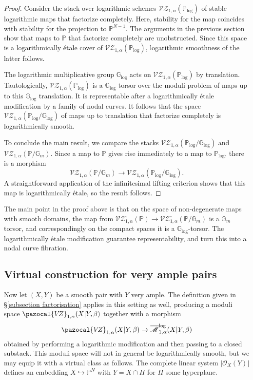 \documentclass[11pt]{amsart}
\newcommand{\PP}{\mathbb P}
\newcommand{\VZ}{\pazocal{V\!Z}}
\newcommand{\OO}{\mathcal{O}}
\renewcommand{\to}{\rightarrow}
\newcommand{\Mcal}{\mathcal{M}}
\newcommand{\ol}[1]{\overline{#1}}
\theoremstyle{definition}
\theoremstyle{definition}
\begin{document}
\begin{proof}
Consider the stack over logarithmic schemes $\mathcal{VZ}_{1,\alpha}(\mathbb P_{\mathrm{log}})$ of stable logarithmic maps that factorize completely. Here, stability for the map coincides with stability for the projection to $\mathbb P^{N-1}$. The arguments in the previous section show that maps to $\mathbb P$ that factorize completely are unobstructed. Since this space is a logarithmically \'etale cover of $\mathcal{VZ}_{1,\alpha}(\mathbb P_{\mathrm{log}})$, logarithmic smoothness of the latter follows.

The logarithmic multiplicative group $\mathbb G_{\mathrm{log}}$ acts on $\mathcal{VZ}_{1,\alpha}(\mathbb P_{\mathrm{log}})$ by translation. Tautologically, $\mathcal{VZ}_{1,\alpha}(\mathbb P_{\mathrm{log}})$ is a $\mathbb G_{\mathrm{log}}$-torsor over the moduli problem of maps up to this $\mathbb G_{\mathrm{log}}$ translation. It is representable after a logarithmically \'etale modification by a family of nodal curves. It follows that the space  $\mathcal{VZ}_{1,\alpha}(\mathbb P_{\mathrm{log}}/\mathbb G_{\mathrm{log}})$ of maps up to translation that factorize completely is logarithmically smooth. 

To conclude the main result, we compare the stacks $\mathcal{VZ}_{1,\alpha}(\mathbb P_{\mathrm{log}}/\mathbb G_{\mathrm{log}})$ and  $\mathcal{VZ}_{1,\alpha}(\mathbb P/\mathbb G_m)$. Since a map to $\mathbb P$ gives rise immediately to a map to $\mathbb P_{\mathrm{log}}$, there is a morphism
\[
\mathcal{VZ}_{1,\alpha}(\mathbb P/\mathbb G_m)\to \mathcal{VZ}_{1,\alpha}(\mathbb P_{\mathrm{log}}/\mathbb G_{\mathrm{log}}).
\]
A straightforward application of the infinitesimal lifting criterion shows that this map is logarithmically \'etale, so the result follows.
\end{proof}

The main point in the proof above is that on the space of non-degenerate maps with smooth domains, the map from $\mathcal{VZ}^\circ_{1,\alpha}(\mathbb P)\to \mathcal{VZ}^\circ_{1,\alpha}(\mathbb P/\mathbb G_m)$ is a $\mathbb G_m$ torsor, and correspondingly on the compact spaces it is a $\mathbb G_{\mathrm{log}}$-torsor. The logarithmically \'etale modification guarantee representability, and turn this into a nodal curve fibration.

\subsection{Virtual construction for very ample pairs}
Now let $(X,Y)$ be a smooth pair with $Y$ very ample. The definition given in \S \ref{subsection factorisation} applies in this setting as well, producing a moduli space $\VZ_{1,\alpha}(X|Y,\beta)$ together with a morphism
\begin{equation*} \VZ_{1,\alpha}(X|Y,\beta) \to \ol\Mcal^{\operatorname{log}}_{1,\alpha}(X|Y,\beta)\end{equation*}
obtained by performing a logarithmic modification and then passing to a closed substack. This moduli space will not in general be logarithmically smooth, but we may equip it with a virtual class as follows. The complete linear system $|\OO_X(Y)|$ defines an embedding $X \hookrightarrow \PP^N$ with $Y=X\cap H$ for $H$ some hyperplane.
\end{document}

